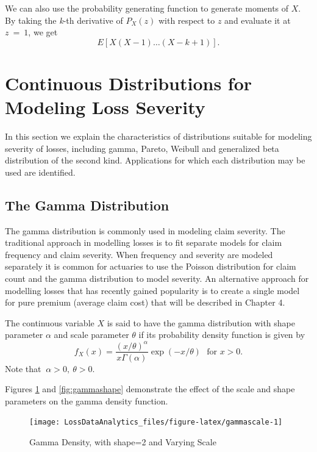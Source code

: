 \documentclass[]{book}
\theoremstyle{definition}
\theoremstyle{definition}
\theoremstyle{definition}
\theoremstyle{remark}
\begin{document}
We can also use the probability generating function to generate moments
of \(X\). By taking the \emph{k}-th derivative of
\(P_{X}\left( z \right)\) with respect to \(z\) and evaluate it at
\(z\  = \ 1\), we get
\[E\left\lbrack X\left( X - 1 \right)\ldots\left( X - k + 1 \right) \right\rbrack .\]

\section{Continuous Distributions for Modeling Loss
Severity}\label{ContinuousDistn}

In this section we explain the characteristics of distributions suitable
for modeling severity of losses, including gamma, Pareto, Weibull and
generalized beta distribution of the second kind. Applications for which
each distribution may be used are identified.

\subsection{The Gamma Distribution}\label{the-gamma-distribution}

The gamma distribution is commonly used in modeling claim severity. The
traditional approach in modelling losses is to fit separate models for
claim frequency and claim severity. When frequency and severity are
modeled separately it is common for actuaries to use the Poisson
distribution for claim count and the gamma distribution to model
severity. An alternative approach for modelling losses that has recently
gained popularity is to create a single model for pure premium (average
claim cost) that will be described in Chapter 4.

The continuous variable \(X\) is said to have the gamma distribution
with shape parameter \(\alpha\) and scale parameter \(\theta\) if its
probability density function is given by
\[f_{X}\left( x \right) = \frac{\left( x/ \theta  \right)^{\alpha}}{x\Gamma\left( \alpha \right)}\exp \left( -x/ \theta \right) \ \ \ \text{for } x > 0 .\]
Note that \(\ \alpha > 0,\ \theta > 0\).

Figures \ref{fig:gammascale} and \ref{fig:gammashape} demonstrate the
effect of the scale and shape parameters on the gamma density function.

\begin{figure}

{\centering \texttt{[image: LossDataAnalytics\_files/figure-latex/gammascale-1]} 

}

\caption{Gamma Density, with shape=2 and Varying Scale}\label{fig:gammascale}
\end{figure}
\end{document}
